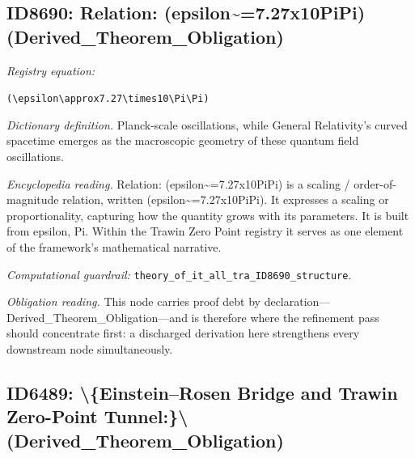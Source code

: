 \documentclass[11pt]{article}
\theoremstyle{remark}
\begin{document}
\subsection{ID8690: Relation: (epsilon\textasciitilde{}=7.27x10PiPi) (Derived\_Theorem\_Obligation)}

\noindent\textit{Registry equation:}\par
{\small\texttt{(\textbackslash{}epsilon\textbackslash{}approx7.27\textbackslash{}times10\textbackslash{}Pi\textbackslash{}Pi)}}\par\medskip
\noindent\textit{Dictionary definition.} Planck-scale oscillations, while General Relativity's curved spacetime emerges as the macroscopic geometry of these quantum field oscillations.\par\medskip
\noindent\textit{Encyclopedia reading.} Relation: (epsilon\textasciitilde{}=7.27x10PiPi) is a scaling / order-of-magnitude relation, written (epsilon\textasciitilde{}=7.27x10PiPi). It expresses a scaling or proportionality, capturing how the quantity grows with its parameters. It is built from epsilon, Pi. Within the Trawin Zero Point registry it serves as one element of the framework's mathematical narrative.
\par\medskip\noindent\textit{Computational guardrail:} \texttt{theory\_of\_it\_all\_tra\_ID8690\_structure}.
\par\medskip\noindent\textit{Obligation reading.} This node carries proof debt by declaration---Derived\_Theorem\_Obligation---and is therefore where the refinement pass should concentrate first: a discharged derivation here strengthens every downstream node simultaneously.

\subsection{ID6489: \textbackslash{}\{Einstein--Rosen Bridge and Trawin Zero-Point Tunnel:\}\textbackslash{} (Derived\_Theorem\_Obligation)}
\end{document}
